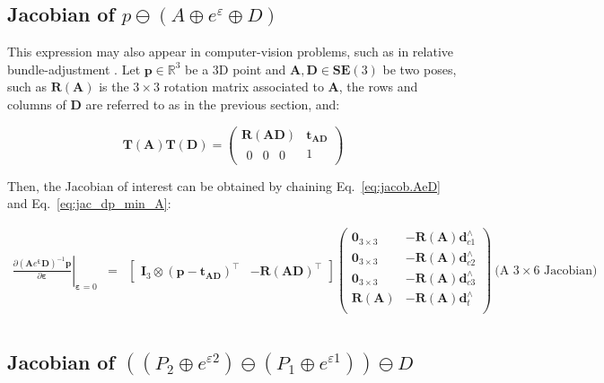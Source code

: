 \documentclass[a4paper,11pt]{report}
\newcommand{\E}{{\bm{\varepsilon}}}
\newcommand{\A}{{\mathbf{A}}}
\newcommand{\D}{{\mathbf{D}}}
\newcommand{\I}{{\mathbf{I}}}
\newcommand{\hatop}[1]{#1^\wedge}
\begin{document}
\subsection{Jacobian of $p \ominus (A \oplus e^\varepsilon \oplus D)$}
\label{eq:jacob_pmA_e_D}

This expression may also appear in computer-vision problems,
such as in relative bundle-adjustment \cite{sibley2009rba}.
Let $\mathbf{p} \in \mathbb{R}^3$ be a 3D point
and $\A,\D \in \mathbf{SE}(3)$ be two poses, such as
$\mathbf{R}(\A)$ is the $3\times 3$ rotation matrix associated to $\A$,
the rows and columns of $\D$ are referred to as in the previous section,
and:

\begin{equation}
\mathbf{T}(\A) \mathbf{T}(\D)
=
\left(
\begin{array}{c|c}
 \mathbf{R}(\A\D) & \mathbf{t_{AD}} \\
\hline
 \begin{array}{ccc} 0 & 0 & 0 \end{array} & 1
\end{array}
\right)
\end{equation}

Then, the Jacobian of interest can be obtained by chaining Eq.~\ref{eq:jacob.AeD} and Eq.~\ref{eq:jac_dp_min_A}:

\begin{eqnarray}
\left. \frac{\partial (\A e^\E \D)^{-1} \mathbf{p}}{\partial \E} \right|_{\E = 0}
&=&
\left[
\begin{array}{cc}
 \I_3 \otimes (\mathbf{p}-\mathbf{t_{AD}})^\top  & -\mathbf{R}(\A\D)^\top
\end{array}
\right]
\left(
\begin{array}{cc}
 \mathbf{0}_{3\times 3}  & -\mathbf{R}(\A) \hatop{\mathbf{d}}_{c1} \\
 \mathbf{0}_{3\times 3}  & -\mathbf{R}(\A) \hatop{\mathbf{d}}_{c2} \\
 \mathbf{0}_{3\times 3}  & -\mathbf{R}(\A) \hatop{\mathbf{d}}_{c3} \\
 \mathbf{R}(\A)        & -\mathbf{R}(\A) \hatop{\mathbf{d}}_{t} \\
\end{array}
\right)
~ \text{(A $3 \times 6$ Jacobian)} \nonumber
\\
~ %
\end{eqnarray}


\subsection{Jacobian of $((P_2 \oplus e^{\varepsilon 2}) \ominus (P_1 \oplus e^{\varepsilon 1})) \ominus D$}
\label{sect:jacob.DinvP2invP2}
\end{document}
